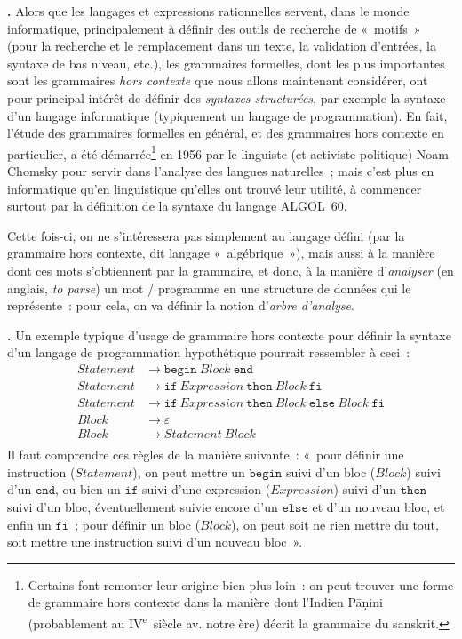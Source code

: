 \documentclass[12pt,a4paper]{article}
\theoremstyle{definition}
\newcommand\thingy{%
\refstepcounter{comcnt}\medskip\noindent\textbf{\thecomcnt.} }
\begin{document}
\thingy Alors que les langages et expressions rationnelles servent,
dans le monde informatique, principalement à définir des outils de
recherche de « motifs » (pour la recherche et le remplacement dans un
texte, la validation d'entrées, la syntaxe de bas niveau, etc.), les
grammaires formelles, dont les plus importantes sont les grammaires
\emph{hors contexte} que nous allons maintenant considérer, ont pour
principal intérêt de définir des \emph{syntaxes structurées}, par
exemple la syntaxe d'un langage informatique (typiquement un langage
de programmation).  En fait, l'étude des grammaires formelles en
général, et des grammaires hors contexte en particulier, a été
démarrée\footnote{Certains font remonter leur origine bien plus loin :
  on peut trouver une forme de grammaire hors contexte dans la manière
  dont l'Indien Pāṇini (probablement au IV\textsuperscript{e} siècle
  av. notre ère) décrit la grammaire du sanskrit.} en 1956 par le
linguiste (et activiste politique) Noam Chomsky pour servir dans
l'analyse des langues naturelles ; mais c'est plus en informatique
qu'en linguistique qu'elles ont trouvé leur utilité, à commencer
surtout par la définition de la syntaxe du langage ALGOL 60.

\smallskip

Cette fois-ci, on ne s'intéressera pas simplement au langage défini
(par la grammaire hors contexte, dit langage « algébrique »), mais
aussi à la manière dont ces mots s'obtiennent par la grammaire, et
donc, à la manière d'\emph{analyser} (en anglais, \emph{to parse}) un
mot / programme en une structure de données qui le représente : pour
cela, on va définir la notion d'\emph{arbre d'analyse}.

\thingy Un exemple typique d'usage de grammaire hors contexte pour
définir la syntaxe d'un langage de programmation hypothétique pourrait
ressembler à ceci :
\[
\begin{aligned}
\mathit{Statement} &\rightarrow \mathtt{begin}\ \mathit{Block}\ \mathtt{end}\\
\mathit{Statement} &\rightarrow \mathtt{if}\ \mathit{Expression}\ \mathtt{then}\ \mathit{Block}\ \mathtt{fi}\\
\mathit{Statement} &\rightarrow \mathtt{if}\ \mathit{Expression}\ \mathtt{then}\ \mathit{Block}\ \mathtt{else}\ \mathit{Block}\ \mathtt{fi}\\
\mathit{Block} &\rightarrow \varepsilon\\
\mathit{Block} &\rightarrow \mathit{Statement}\ \mathit{Block}\\
\end{aligned}
\]
Il faut comprendre ces règles de la manière suivante : « pour définir
une instruction ($\mathit{Statement}$), on peut mettre un
$\mathtt{begin}$ suivi d'un bloc ($\mathit{Block}$) suivi d'un
$\mathtt{end}$, ou bien un $\mathtt{if}$ suivi d'une expression
($\mathit{Expression}$) suivi d'un $\mathtt{then}$ suivi d'un bloc,
éventuellement suivie encore d'un $\mathtt{else}$ et d'un nouveau
bloc, et enfin un $\mathtt{fi}$ ; pour définir un bloc
($\mathit{Block}$), on peut soit ne rien mettre du tout, soit mettre
une instruction suivi d'un nouveau bloc ».
\end{document}
